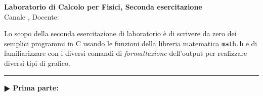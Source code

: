\documentclass[11pt]{article}
\begin{document}
\pagestyle{empty}

\begin{center}
{\Large \bf  Laboratorio di Calcolo per Fisici, Seconda esercitazione\\[2mm]}
{\large Canale \canale, Docente: \docente}
\end{center}
\vspace{1mm}

\begin{mdframed}[backgroundcolor=panna]
  Lo scopo della seconda esercitazione di laboratorio \`e di
  scrivere da zero dei semplici programmi in C usando le funzioni
  della libreria matematica \texttt{math.h} e di familiarizzare con i diversi
  comandi di {\em formattazione\/} dell'output per realizzare diversi
  tipi di grafico.
\end{mdframed}
%
%
\hrule
\vspace{1mm}
\textbf{$\RHD$ Prima parte:} 
\end{document}
